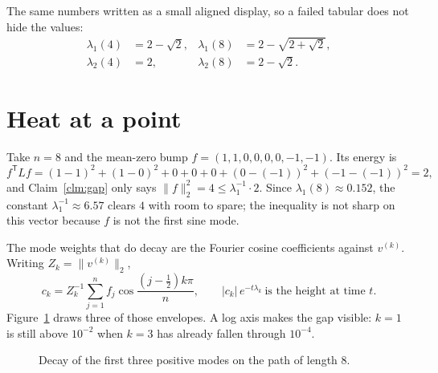 \documentclass[10pt,twocolumn]{article}
\theoremstyle{definition}
\begin{document}
The same numbers written as a small aligned display, so a failed tabular does not hide the values:
\begin{align*}
\lambda_1(4)&=2-\sqrt{2},&
\lambda_1(8)&=2-\sqrt{2+\sqrt{2}},\\
\lambda_2(4)&=2,&
\lambda_2(8)&=2-\sqrt{2}.
\end{align*}

\section{Heat at a point}
\label{sec:heat}
Take \(n=8\) and the mean-zero bump \(f=(1,1,0,0,0,0,-1,-1)\). Its energy is
\begin{equation}
f^{\mathsf T}Lf = (1-1)^2+(1-0)^2+0+0+0+(0-(-1))^2+(-1-(-1))^2 = 2,
\end{equation}
and Claim~\ref{clm:gap} only says \(\|f\|_2^2=4\le \lambda_1^{-1}\cdot 2\). Since \(\lambda_1(8)\approx 0.152\), the constant \(\lambda_1^{-1}\approx 6.57\) clears \(4\) with room to spare; the inequality is not sharp on this vector because \(f\) is not the first sine mode.

The mode weights that do decay are the Fourier cosine coefficients against \(v^{(k)}\). Writing \(Z_k=\|v^{(k)}\|_2\),
\begin{equation}
c_k = Z_k^{-1}\sum_{j=1}^{n} f_j\cos\frac{(j-\tfrac12)k\pi}{n},
\qquad
|c_k|\,e^{-t\lambda_k}\ \text{is the height at time \(t\).}
\end{equation}
Figure~\ref{fig:decay} draws three of those envelopes. A log axis makes the gap visible: \(k=1\) is still above \(10^{-2}\) when \(k=3\) has already fallen through \(10^{-4}\).

\begin{figure}[t]
\centering
{}
\caption{Decay of the first three positive modes on the path of length 8.}
\label{fig:decay}
\end{figure}
\end{document}
